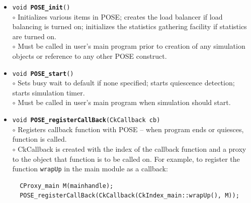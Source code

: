 \documentclass[10pt]{article}
\begin{document}
\begin{itemize}
\item {\tt void {\bf POSE\_init}()}\\
	$\circ$ Initializes various items in POSE; creates the load balancer
	if load balancing is turned on; initializes the statistics
	gathering facility if statistics are turned on.\\
	$\circ$ Must be called in user's main program prior to creation of any
	simulation objects or reference to any other POSE construct.
\item {\tt void {\bf POSE\_start}()}\\
	$\circ$ Sets busy wait to default if none specified; starts
	quiescence detection; starts simulation timer.\\
	$\circ$ Must be called in user's main program when simulation
	should start.
\item {\tt void {\bf POSE\_registerCallBack}(CkCallback cb)}\\
	$\circ$ Registers callback function with POSE -- when program
	ends or quiesces, function is called.\\
	$\circ$ CkCallback is created with the index of the callback
	function and a proxy to the object that function is to be
	called on.  For example, to register the function {\tt wrapUp}
	in the main module as a callback:

\begin{verbatim}
  CProxy_main M(mainhandle);
  POSE_registerCallBack(CkCallback(CkIndex_main::wrapUp(), M));
\end{verbatim}


\end{itemize}
\end{document}

